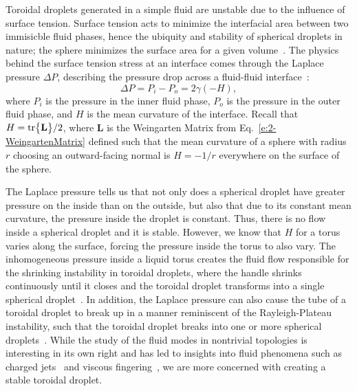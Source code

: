 Toroidal droplets generated in a simple fluid are unstable due to the influence of surface tension.
Surface tension acts to minimize the interfacial area between two immisicble fluid phases, hence the ubiquity and stability of spherical droplets in nature; the sphere minimizes the surface area for a given volume~\cite{RN178}.
The physics behind the surface tension stress at an interface comes through the Laplace pressure $\Delta P$, describing the pressure drop across a fluid-fluid interface~\cite{RN178}:
\begin{equation}\label{e:3-LapPres}
  \Delta P = P_i - P_o = 2 \gamma (- H),
\end{equation}
where $P_i$ is the pressure in the inner fluid phase, $P_o$ is the pressure in the outer fluid phase, and $H$ is the mean curvature of the interface.
Recall that $H = \textup{tr}\big \{ \mathbf{L} \big \}/2$, where $\mathbf{L}$ is the Weingarten Matrix from Eq.~\ref{e:2-WeingartenMatrix} defined such that the mean curvature of a sphere with radius $r$ choosing an outward-facing normal is $H = -1/r$ everywhere on the surface of the sphere.

The Laplace pressure tells us that not only does a spherical droplet have greater pressure on the inside than on the outside, but also that due to its constant mean curvature, the pressure inside the droplet is constant.
Thus, there is no flow inside a spherical droplet and it is stable.
However, we know that $H$ for a torus varies along the surface, forcing the pressure inside the torus to also vary.
The inhomogeneous pressure inside a liquid torus creates the fluid flow responsible for the shrinking instability in toroidal droplets, where the handle shrinks continuously until it closes and the toroidal droplet transforms into a single spherical droplet~\cite{RN29,RN255}.
In addition, the Laplace pressure can also cause the tube of a toroidal droplet to break up in a manner reminiscent of the Rayleigh-Plateau instability, such that the toroidal droplet breaks into one or more spherical droplets~\cite{RN29,RN256}.
While the study of the fluid modes in nontrivial topologies is interesting in its own right and has led to insights into fluid phenomena such as charged jets~\cite{RN256} and viscous fingering~\cite{RN254}, we are more concerned with creating a stable toroidal droplet.

